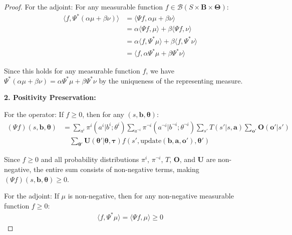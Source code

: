 \documentclass[a4paper,12pt]{report}
\begin{document}
\begin{proof}
    For the adjoint: For any measurable function
    $f \in \mathcal{B}(S \times \boldsymbol{B}\times \boldsymbol{\Theta})$:
    \begin{align}
        \langle f, \Psi^{*}(\alpha\mu + \beta\nu) \rangle & = \langle \Psi f, \alpha\mu + \beta\nu \rangle                               \\
                                                          & = \alpha\langle \Psi f, \mu \rangle + \beta\langle \Psi f, \nu \rangle       \\
                                                          & = \alpha\langle f, \Psi^{*}\mu \rangle + \beta\langle f, \Psi^{*}\nu \rangle \\
                                                          & = \langle f, \alpha\Psi^{*}\mu + \beta\Psi^{*}\nu \rangle
    \end{align}

    Since this holds for any measurable function $f$, we have $\Psi^{*}(\alpha\mu +
        \beta\nu) = \alpha\Psi^{*}\mu + \beta\Psi^{*}\nu$ by the uniqueness of the representing
    measure.

    \textbf{2. Positivity Preservation:}

    For the operator: If $f \geq 0$, then for any $(s, \boldsymbol{b}, \boldsymbol{\theta}
        )$:
    \begin{align}
        (\Psi f)(s, \boldsymbol{b}, \boldsymbol{\theta}) & = \sum_{a^i}\pi^{i}(a^{i}|b^{i}; \theta^{i}) \sum_{a^{\neg i}}\pi^{\neg i}(a^{\neg i}|b^{\neg i}; \theta^{\neg i}) \sum_{s'}T(s'|s, \boldsymbol{a}) \sum_{\boldsymbol{o}'}\boldsymbol{O}(\boldsymbol{o}'|s') \\
                                                         & \quad \sum_{\boldsymbol{\theta}'}\boldsymbol{U}(\boldsymbol{\theta}'|\boldsymbol{\theta}, \boldsymbol{\tau}) f(s', \text{update}(\boldsymbol{b}, \boldsymbol{a}, \boldsymbol{o}'), \boldsymbol{\theta}')
    \end{align}

    Since $f \geq 0$ and all probability distributions $\pi^{i}$, $\pi^{\neg i}$, $T$,
    $\boldsymbol{O}$, and $\boldsymbol{U}$ are non-negative, the entire sum
    consists of non-negative terms, making $(\Psi f)(s, \boldsymbol{b}, \boldsymbol
        {\theta}) \geq 0$.

    For the adjoint: If $\mu$ is non-negative, then for any non-negative measurable
    function $f \geq 0$:
    \begin{align}
        \langle f, \Psi^{*}\mu \rangle = \langle \Psi f, \mu \rangle \geq 0
    \end{align}


\end{proof}
\end{document}
